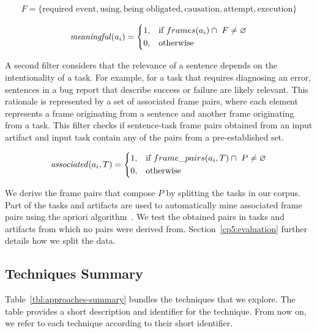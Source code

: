 \begin{equation}
\begin{split}
F = \{ \text{required event}, \text{using}, \text{being obligated}, \text{causation}, \text{attempt}, \text{execution} \} 
\end{split}
\end{equation}





\begin{equation}
\text{\textit{meaningful}}(a_i) = \left \{
\begin{aligned}
    &1, && \text{if}\ frames(a_i) \cap ~F \ne \emptyset \\
    &0, && \text{otherwise}
\end{aligned} \right.
\end{equation} 


\medskip
A second filter considers that the relevance of a sentence depends on the intentionality of a task. 
For example, for a task that requires diagnosing an error, sentences in a bug report that describe success or failure are likely relevant. 
This rationale is represented by a set of associated frame pairs, where each element represents a frame originating from a sentence and another frame originating from a task.
This filter checks if sentence-task frame pairs obtained from an input artifact and input task contain any of the pairs from a pre-established set.




\begin{equation}
\text{\textit{associated}}(a_i, T) = \left \{
\begin{aligned}
    &1, && \text{if}\ frame\_pairs(a_i, T) \cap ~P \ne \emptyset \\
    &0, && \text{otherwise}
\end{aligned} \right.
\end{equation} 

\smallskip
We derive the frame pairs that compose $P$ by splitting the tasks in our corpus. Part of the tasks and artifacts are used to automatically
mine associated frame pairs using the apriori algorithm~\cite{agrawal1994apriori}. We test the obtained pairs in tasks and artifacts from which no pairs were derived from. 
Section~\ref{cp5:evaluation} further details how we split the data.








\subsection{Techniques Summary}


Table~\ref{tbl:approaches-summary} bundles the techniques that we explore.
The table provides a short description and identifier for the technique. From now on, we refer to each technique according to their short identifier.


